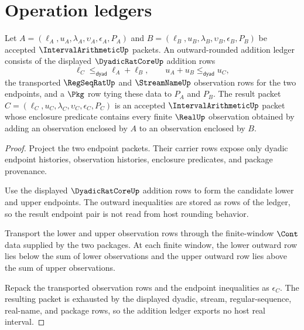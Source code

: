 \section{Operation ledgers}
\label{sec:intervalarithmetic-operation-ledgers}

\begin{theorem}
\label{thm:intervalarithmetic-outward-rounded-addition}
Let $A=(\ell_A,u_A,\lambda_A,\upsilon_A,\epsilon_A,P_A)$ and $B=(\ell_B,u_B,\lambda_B,\upsilon_B,\epsilon_B,P_B)$ be accepted $\IntervalArithmeticUp$ packets. An outward-rounded addition ledger consists of the displayed $\DyadicRatCoreUp$ addition rows
$$
\ell_C \leq_{\mathsf{dyad}} \ell_A+\ell_B,
\qquad
u_A+u_B \leq_{\mathsf{dyad}} u_C,
$$
the transported $\RegSeqRatUp$ and $\StreamNameUp$ observation rows for the two endpoints, and a $\Pkg$ row tying these data to $P_A$ and $P_B$. The result packet $C=(\ell_C,u_C,\lambda_C,\upsilon_C,\epsilon_C,P_C)$ is an accepted $\IntervalArithmeticUp$ packet whose enclosure predicate contains every finite $\RealUp$ observation obtained by adding an observation enclosed by $A$ to an observation enclosed by $B$.
\end{theorem}
\begin{proof}
Project the two endpoint packets. Their carrier rows expose only dyadic endpoint histories, observation histories, enclosure predicates, and package provenance.

Use the displayed $\DyadicRatCoreUp$ addition rows to form the candidate lower and upper endpoints. The outward inequalities are stored as rows of the ledger, so the result endpoint pair is not read from host rounding behavior.

Transport the lower and upper observation rows through the finite-window $\Cont$ data supplied by the two packages. At each finite window, the lower outward row lies below the sum of lower observations and the upper outward row lies above the sum of upper observations.

Repack the transported observation rows and the endpoint inequalities as $\epsilon_C$. The resulting packet is exhausted by the displayed dyadic, stream, regular-sequence, real-name, and package rows, so the addition ledger exports no host real interval.
\end{proof}

